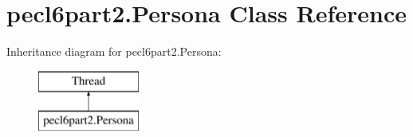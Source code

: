 \hypertarget{classpecl6part2_1_1_persona}{}\section{pecl6part2.\+Persona Class Reference}
\label{classpecl6part2_1_1_persona}
Inheritance diagram for pecl6part2.\+Persona\+:\begin{figure}[H]
\begin{center}
\leavevmode
\includegraphics[height=2.000000cm]{classpecl6part2_1_1_persona}
\end{center}
\end{figure}
